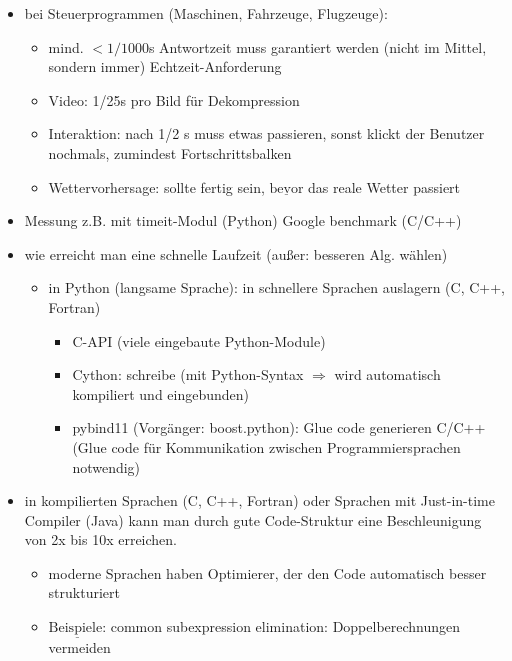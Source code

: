     \begin{itemize}
        \item bei Steuerprogrammen (Maschinen, Fahrzeuge, Flugzeuge):
        \begin{itemize}
            \item mind. $< 1/1000$s Antwortzeit muss garantiert werden (nicht im Mittel, sondern immer) \glqq Echtzeit-Anforderung\grqq
            \item Video: 1/25s pro Bild für Dekompression
            \item Interaktion: nach 1/2 s muss etwas passieren, sonst klickt der Benutzer nochmals, zumindest Fortschrittsbalken
            \item Wettervorhersage: sollte fertig sein, $\underline{\text{bevor}}$ das reale Wetter passiert
        \end{itemize}
        \item Messung z.B. mit timeit-Modul (Python) Google benchmark (C/C++)
        \item wie erreicht man eine schnelle Laufzeit (außer: besseren Alg. wählen)
        \begin{itemize}
            \item in Python (langsame Sprache): in schnellere Sprachen auslagern (C, C++, Fortran)
            \begin{itemize}
                \item C-API (viele eingebaute Python-Module)
                \item Cython: schreibe (mit Python-Syntax $\Rightarrow$ wird automatisch kompiliert und eingebunden)
                \item pybind11 (Vorgänger: boost.python): Glue code generieren C/C++ (Glue code für Kommunikation zwischen Programmiersprachen notwendig)
            \end{itemize}
        \end{itemize}
        \item in kompilierten Sprachen (C, C++, Fortran) oder Sprachen mit Just-in-time Compiler (Java) kann man durch gute Code-Struktur eine Beschleunigung von 2x bis 10x erreichen.
        \begin{itemize}
            \item moderne Sprachen haben \glqq Optimierer\grqq , der den Code automatisch besser strukturiert
            \item $\underline{\text{Beispiele:}}$ \glqq common subexpression elimination\grqq : Doppelberechnungen vermeiden \\

\end{itemize}
\end{itemize}
